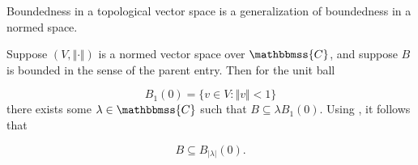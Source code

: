 \documentclass[12pt]{article}
\newcommand{\C}{\mathbbmss{C}}
\begin{document}
Boundedness in a topological vector space is a generalization of boundedness in a normed space. 

Suppose $(V,\Vert\cdot \Vert)$ is a normed vector space over $\C$, and suppose $B$ is bounded in the sense of the parent entry. Then for the unit ball 

$$ B_1(0)=\{ v\in V : \Vert v \Vert <1\}$$
there exists some $\lambda \in \C$ such that $B\subseteq \lambda B_1(0)$. Using 
, it follows that 

$$  B \subseteq B_{|\lambda|}(0).$$
\end{document}
